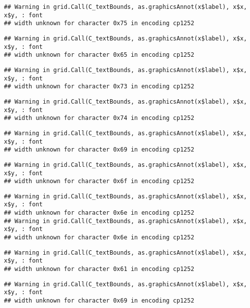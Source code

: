 \documentclass[
]{article}
\begin{document}
\begin{verbatim}
## Warning in grid.Call(C_textBounds, as.graphicsAnnot(x$label), x$x, x$y, : font
## width unknown for character 0x75 in encoding cp1252
\end{verbatim}

\begin{verbatim}
## Warning in grid.Call(C_textBounds, as.graphicsAnnot(x$label), x$x, x$y, : font
## width unknown for character 0x65 in encoding cp1252
\end{verbatim}

\begin{verbatim}
## Warning in grid.Call(C_textBounds, as.graphicsAnnot(x$label), x$x, x$y, : font
## width unknown for character 0x73 in encoding cp1252
\end{verbatim}

\begin{verbatim}
## Warning in grid.Call(C_textBounds, as.graphicsAnnot(x$label), x$x, x$y, : font
## width unknown for character 0x74 in encoding cp1252
\end{verbatim}

\begin{verbatim}
## Warning in grid.Call(C_textBounds, as.graphicsAnnot(x$label), x$x, x$y, : font
## width unknown for character 0x69 in encoding cp1252
\end{verbatim}

\begin{verbatim}
## Warning in grid.Call(C_textBounds, as.graphicsAnnot(x$label), x$x, x$y, : font
## width unknown for character 0x6f in encoding cp1252
\end{verbatim}

\begin{verbatim}
## Warning in grid.Call(C_textBounds, as.graphicsAnnot(x$label), x$x, x$y, : font
## width unknown for character 0x6e in encoding cp1252
## Warning in grid.Call(C_textBounds, as.graphicsAnnot(x$label), x$x, x$y, : font
## width unknown for character 0x6e in encoding cp1252
\end{verbatim}

\begin{verbatim}
## Warning in grid.Call(C_textBounds, as.graphicsAnnot(x$label), x$x, x$y, : font
## width unknown for character 0x61 in encoding cp1252
\end{verbatim}

\begin{verbatim}
## Warning in grid.Call(C_textBounds, as.graphicsAnnot(x$label), x$x, x$y, : font
## width unknown for character 0x69 in encoding cp1252
\end{verbatim}
\end{document}
